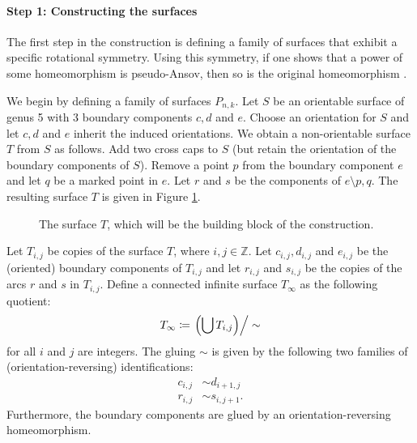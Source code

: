 \paragraph{Step 1: Constructing the surfaces}

The first step in the construction is defining a family of surfaces that exhibit a specific rotational
symmetry. Using this symmetry, if one shows that a power of some homeomorphism is pseudo-Ansov, then so is
the original homeomorphism 
\cite{penner1991bounds}.


We begin by defining a family of surfaces $P_{n,k}$. Let $S$ be an orientable surface of genus 5 with 3
boundary components $c,d$ and $e$. Choose an orientation for $S$ and let $c,d$ and $e$ inherit the induced orientations. We obtain a non-orientable surface $T$ from $S$ as follows.  Add two cross caps to $S$ (but retain the orientation of the boundary components of $S$). Remove a point $p$ from the boundary component $e$ and let $q$ be a marked point in $e$.  Let  $r$ and
$s$ be the components of $e\setminus{p,q}$. The resulting surface $T$ is given in Figure \ref{fig:buildingblock}.

\begin{figure}[]
    \centering
    \caption{The surface $T$, which will be the building block of the construction.}
    \label{fig:buildingblock}
\end{figure}

Let $T_{i,j}$ be copies of the surface $T$, where $i,j \in \mathbb{Z}$. Let $c_{i,j}, d_{i,j}$ and $e_{i,j}$ be the (oriented) boundary components of $T_{i,j}$ and let $r_{i,j}$ and $s_{i,j}$ be the copies of the arcs $r$ and $s$ in $T_{i,j}$. Define a connected infinite surface $T_\infty$ as the following quotient:
\begin{align*}
  T_\infty \coloneqq \left. \left( \bigcup T_{i,j} \right)\right/\sim
\end{align*}
for all $i$ and $j$ are integers. The gluing $\sim$ is given by the following two families of (orientation-reversing)
identifications:
\begin{align}
\label{identification}
  c_{i,j} &\sim d_{i+1,j} \\
  r_{i,j} &\sim s_{i,j+1}.
\end{align}
Furthermore, the boundary components are glued by an orientation-reversing homeomorphism.


